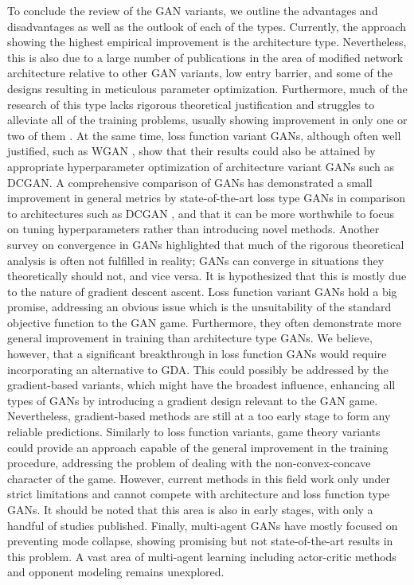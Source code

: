 To conclude the review of the GAN variants, we outline the advantages and disadvantages as well as the outlook of each of the types. Currently, the approach showing the highest empirical improvement is the architecture type. Nevertheless, this is also due to a large number of publications in the area of modified network architecture relative to other GAN variants, low entry barrier, and some of the designs resulting in meticulous parameter optimization. Furthermore, much of the research of this type lacks rigorous theoretical justification and struggles to alleviate all of the training problems, usually showing improvement in only one or two of them . At the same time, loss function variant GANs, although often well justified, such as WGAN , show that their results could also be attained by appropriate hyperparameter optimization of architecture variant GANs such as DCGAN. A comprehensive comparison of GANs  has demonstrated a small improvement in general metrics by state-of-the-art loss type GANs in comparison to architectures such as DCGAN , and that it can be more worthwhile to focus on tuning hyperparameters rather than introducing novel methods.
Another survey on convergence in GANs  highlighted that much of the rigorous theoretical analysis is often not fulfilled in reality; GANs can converge in situations they theoretically should not, and vice versa. It is hypothesized that this is mostly due to the nature of gradient descent ascent. Loss function variant GANs hold a big promise, addressing an obvious issue which is the unsuitability of the standard objective function to the GAN game. Furthermore, they often demonstrate more general improvement in training than architecture type GANs. We believe, however, that a significant breakthrough in loss function GANs would require incorporating an alternative to GDA. This could possibly be addressed by the gradient-based variants, which might have the broadest influence, enhancing all types of GANs by introducing a gradient design relevant to the GAN game. Nevertheless, gradient-based methods are still at a too early stage to form any reliable predictions. Similarly to loss function variants, game theory variants could provide an approach capable of the general improvement in the training procedure, addressing the problem of dealing with the non-convex-concave character of the game. However, current methods in this field work only under strict limitations and cannot compete with architecture and loss function type GANs. It should be noted that this area is also in early stages, with only a handful of studies published. Finally, multi-agent GANs have mostly focused on preventing mode collapse, showing promising but not state-of-the-art results in this problem. A vast area of multi-agent learning including actor-critic methods and opponent modeling  remains unexplored.

